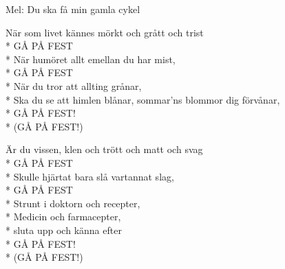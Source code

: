 \begin{SongText}[Gå på fest]
    \begin{SongInfo}
        Mel: Du ska få min gamla cykel
    \end{SongInfo}
    \begin{SongVerse}
        När som livet kännes mörkt och grått och trist\\*%
        GÅ PÅ FEST\\*%
        När humöret allt emellan du har mist,\\*%
        GÅ PÅ FEST\\*%
        När du tror att allting grånar,\\*%
        Ska du se att himlen blånar, sommar'ns blommor dig 
        förvånar,\\*%
        GÅ PÅ FEST!\\*%
        (GÅ PÅ FEST!)
    \end{SongVerse}
    \begin{SongVerse}
        Är du vissen, klen och trött och matt och svag\\*%
        GÅ PÅ FEST\\*%
        Skulle hjärtat bara slå vartannat slag,\\*%
        GÅ PÅ FEST\\*%
        Strunt i doktorn och recepter,\\*%
        Medicin och farmacepter,\\*%
        sluta upp och känna efter\\*%
        GÅ PÅ FEST!\\*%
        (GÅ PÅ FEST!)
    \end{SongVerse}
\end{SongText}
